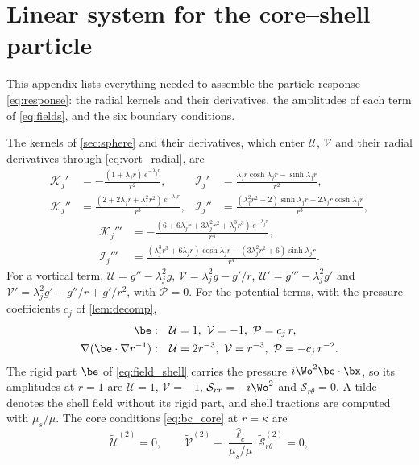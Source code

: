 \section{Linear system for the core--shell particle}\label{app:sphere}
This appendix lists everything needed to assemble the particle response \eqref{eq:response}: the radial kernels and
their derivatives, the amplitudes of each term of \cref{eq:fields}, and the six boundary conditions.

The kernels of \cref{sec:sphere} and their derivatives, which enter $\mathcal U$, $\mathcal V$ and their radial
derivatives through \cref{eq:vort_radial}, are
\begin{align*}
  \mathcal K_j'&=-\frac{(1+\lambda_jr)\,e^{-\lambda_jr}}{r^2}, &
  \mathcal I_j'&=\frac{\lambda_jr\cosh\lambda_jr-\sinh\lambda_jr}{r^2},\\
  \mathcal K_j''&=\frac{(2+2\lambda_jr+\lambda_j^2r^2)\,e^{-\lambda_jr}}{r^3}, &
  \mathcal I_j''&=\frac{(\lambda_j^2r^2+2)\sinh\lambda_jr-2\lambda_jr\cosh\lambda_jr}{r^3},
\end{align*}
\begin{align*}
  \mathcal K_j'''&=-\frac{(6+6\lambda_jr+3\lambda_j^2r^2+\lambda_j^3r^3)\,e^{-\lambda_jr}}{r^4},\\
  \mathcal I_j'''&=\frac{(\lambda_j^3r^3+6\lambda_jr)\cosh\lambda_jr-(3\lambda_j^2r^2+6)\sinh\lambda_jr}{r^4}.
\end{align*}
For a vortical term, $\mathcal U=g''-\lambda_j^2g$, $\mathcal V=\lambda_j^2g-g'/r$, $\mathcal U'=g'''-\lambda_j^2g'$ and
$\mathcal V'=\lambda_j^2g'-g''/r+g'/r^2$, with $\mathcal P=0$. For the potential terms, with the pressure
coefficients $c_j$ of \cref{lem:decomp},
\begin{align*}
  \be:&\quad \mathcal U=1,\ \mathcal V=-1,\ \mathcal P=c_j\,r,\\
  \nabla(\be\cdot\nabla r^{-1}):&\quad \mathcal U=2r^{-3},\ \mathcal V=r^{-3},\ \mathcal P=-c_j\,r^{-2}.
\end{align*}
The rigid part $\be$ of \cref{eq:field_shell} carries the pressure $i\Wo^2\be\cdot\bx$, so its amplitudes at $r=1$ are
$\mathcal U=1$, $\mathcal V=-1$, $\mathcal S_{rr}=-i\Wo^2$ and $\mathcal S_{r\theta}=0$. A tilde denotes the shell
field without its rigid part, and shell tractions are computed with $\mu_s/\mu$. The core conditions
\eqref{eq:bc_core} at $r=\kappa$ are
\begin{equation*}
  \tilde{\mathcal U}^{(2)}=0,\qquad \tilde{\mathcal V}^{(2)}-\frac{\hat\ell_c}{\mu_s/\mu}\,\tilde{\mathcal S}^{(2)}_{r\theta}=0,
\end{equation*}
